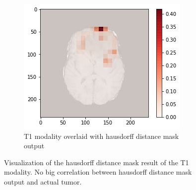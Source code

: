 \begin{figure}[H]
\begin{subfigure}{.33\textwidth}
    \end{subfigure}
        \begin{subfigure}{.33\textwidth}
        \centering
        \includegraphics[width=\linewidth]{chapters/07_brats3d/images/09_t1_hdm10.png}
        \caption{T1 modality overlaid with hausdorff distance mask output}
    \end{subfigure}
    \caption{Visualization of the hausdorff distance mask result of the T1 modality. No big correlation between hausdorff distance mask output and actual tumor.}
\end{figure}

